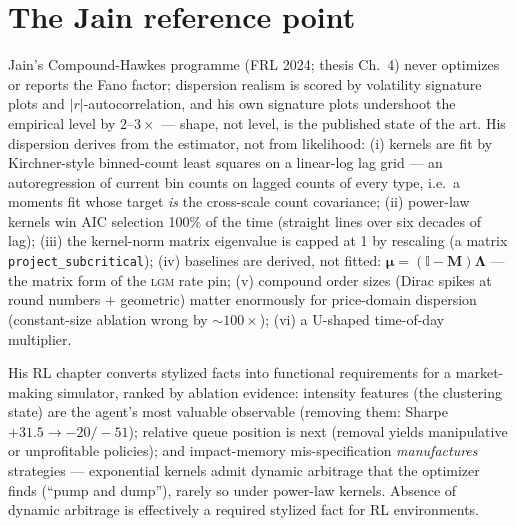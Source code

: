 \documentclass[11pt]{article}
\newcommand{\lgm}{\textsc{lgm}}
\begin{document}
\section{The Jain reference point}
Jain's Compound-Hawkes programme (FRL 2024; thesis Ch.~4) never optimizes or
reports the Fano factor; dispersion realism is scored by volatility signature
plots and $|r|$-autocorrelation, and his own signature plots undershoot the
empirical level by $2$--$3\times$ --- shape, not level, is the published
state of the art. His dispersion derives from the estimator, not from
likelihood: (i) kernels are fit by Kirchner-style binned-count least squares
on a linear-log lag grid --- an autoregression of current bin counts on
lagged counts of every type, i.e.\ a moments fit whose target \emph{is} the
cross-scale count covariance; (ii) power-law kernels win AIC selection 100\%
of the time (straight lines over six decades of lag); (iii) the kernel-norm
matrix eigenvalue is capped at 1 by rescaling (a matrix
\texttt{project\_subcritical}); (iv) baselines are derived, not fitted:
$\boldsymbol{\mu}=(\mathbb{I}-\boldsymbol{M})\boldsymbol{\Lambda}$ --- the
matrix form of the \lgm{} rate pin; (v) compound order sizes (Dirac spikes at
round numbers $+$ geometric) matter enormously for price-domain dispersion
(constant-size ablation wrong by $\sim$$100\times$); (vi) a U-shaped
time-of-day multiplier.

His RL chapter converts stylized facts into functional requirements for a
market-making simulator, ranked by ablation evidence: intensity features
(the clustering state) are the agent's most valuable observable (removing
them: Sharpe $+31.5\to-20/-51$); relative queue position is next (removal
yields manipulative or unprofitable policies); and impact-memory
mis-specification \emph{manufactures} strategies --- exponential kernels
admit dynamic arbitrage that the optimizer finds (``pump and dump''),
rarely so under power-law kernels. Absence of dynamic arbitrage is
effectively a required stylized fact for RL environments.
\end{document}
